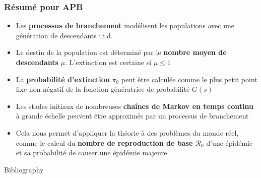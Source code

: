 \documentclass[aspectratio=169]{beamer}\usepackage[]{graphicx}\usepackage[]{xcolor}
\begin{document}
\begin{frame}
    \frametitle{Résumé pour APB}

    \begin{itemize}
        \item Les \textbf{processus de branchement} modélisent les populations avec une génération de descendants i.i.d.

        \item Le destin de la population est déterminé par le \textbf{nombre moyen de descendants} $\mu$. L'extinction est certaine si $\mu \le 1$

        \item La \textbf{probabilité d'extinction} $\pi_0$ peut être calculée comme le plus petit point fixe non négatif de la fonction génératrice de probabilité $G(s)$

        \item Les stades initiaux de nombreuses \textbf{chaînes de Markov en temps continu} à grande échelle peuvent être approximés par un processus de branchement

        \item Cela nous permet d'appliquer la théorie à des problèmes du monde réel, comme le calcul du \textbf{nombre de reproduction de base $\mathcal{R}_0$} d'une épidémie et sa probabilité de causer une épidémie majeure
    \end{itemize}
\end{frame}





\begin{frame}[allowframebreaks]{Bibliography}


\end{frame}
\end{document}
